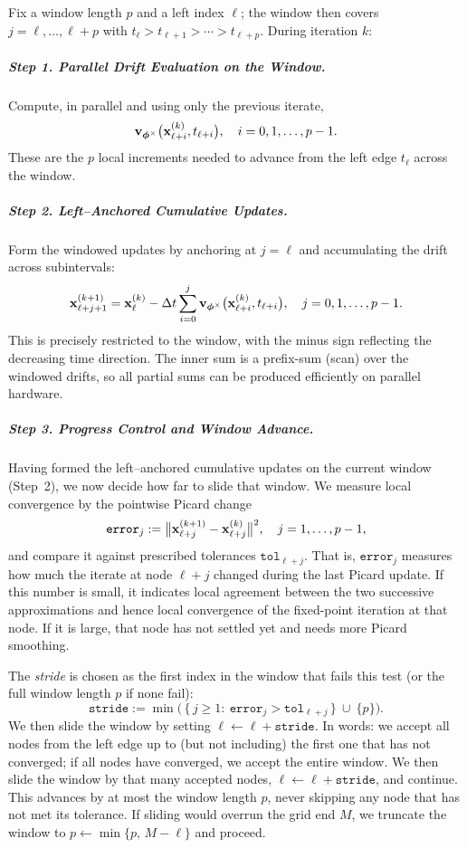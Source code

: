 Fix a window length $p$ and a left index $\ell$; the window then covers
$j=\ell,\ldots,\ell+p$ with $t_\ell>t_{\ell+1}>\cdots>t_{\ell+p}$. During
iteration $k$:

\subparagraph{Step 1. Parallel Drift Evaluation on the Window.}
Compute, in parallel and using only the previous iterate,
\[
{\mathbf{v}}_{{\bm{\phi}}^\times} \big({\mathbf{x}}^{(k)}_{\ell+i}, t_{\ell+i}\big),
\quad i=0,1,\ldots,p-1.
\]
These are the $p$ local increments needed to advance from the left edge
$t_\ell$ across the window.

\subparagraph{Step 2. Left–Anchored Cumulative Updates.}
Form the windowed updates by anchoring at $j=\ell$ and accumulating the drift across subintervals:
\begin{equation}\label{eq:window_update}
{\mathbf{x}}^{(k+1)}_{\ell+j+1}
 = 
{\mathbf{x}}^{(k)}_{\ell}
 - \Delta t \sum_{i=0}^{j}
{\mathbf{v}}_{{\bm{\phi}}^\times} \big({\mathbf{x}}^{(k)}_{\ell+i}, t_{\ell+i}\big),
\quad j=0,1,\ldots,p-1.
\end{equation}
This is precisely  restricted to the
window, with the minus sign reflecting the decreasing time direction. The inner
sum is a prefix-sum (scan) over the windowed drifts, so all partial sums
can be produced efficiently on parallel hardware.

\subparagraph{Step 3. Progress Control and Window Advance.}
Having formed the left–anchored cumulative updates on the current window (Step~2),
we now decide how far to slide that window. We measure local convergence
by the pointwise Picard change
\[
\mathtt{error}_j
:=
\big\|{\mathbf{x}}^{(k+1)}_{\ell+j}-{\mathbf{x}}^{(k)}_{\ell+j}\big\|^2,
\quad j=1,\ldots,p-1,
\]
and compare it against prescribed tolerances $\mathtt{tol}_{\ell+j}$. That is, $\mathtt{error}_j$ measures how much the iterate at node $\ell+j$ changed during the last Picard
update. If this number is small, it indicates local agreement between the two
successive approximations and hence local convergence of the fixed-point
iteration at that node. If it is large, that node has not settled yet and needs
more Picard smoothing.


The \emph{stride} is chosen as the first index in the window that fails this
test (or the full window length $p$ if none fail):
\[
\mathtt{stride}
:=
\min\Big(\,\{\,j\ge 1:\ \mathtt{error}_j>\mathtt{tol}_{\ell+j}\,\}\ \cup\ \{p\}\Big).
\]
We then slide the window by setting $\ell \leftarrow \ell+\mathtt{stride}$.  In words: we accept all nodes from the left edge up to (but not including) the
first one that has not converged; if all nodes have converged, we accept the
entire window. We then slide the window by that many accepted nodes,
$\ell \leftarrow \ell+\mathtt{stride}$, and continue. This advances by at
most the window length $p$, never skipping any node that has not met its
tolerance. If sliding would overrun the grid end $M$, we truncate the window to
$p \leftarrow \min\{p,\,M-\ell\}$ and proceed.



